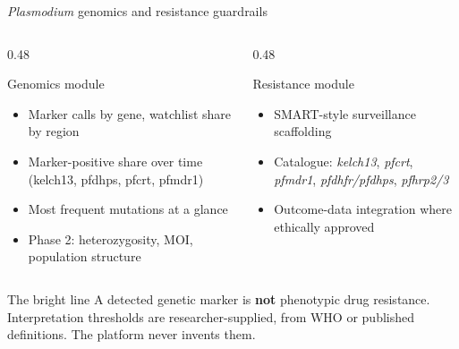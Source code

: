 \documentclass[aspectratio=169,11pt]{beamer}
\begin{document}
\begin{frame}{\emph{Plasmodium} genomics and resistance guardrails}
  \begin{columns}[c]
    \begin{column}{0.48\textwidth}
      \begin{block}{Genomics module}
        \begin{itemize}\small
          \item Marker calls by gene, watchlist share by region
          \item Marker-positive share over time (kelch13, pfdhps, pfcrt, pfmdr1)
          \item Most frequent mutations at a glance
          \item Phase 2: heterozygosity, MOI, population structure
        \end{itemize}
      \end{block}
    \end{column}
    \begin{column}{0.48\textwidth}
      \begin{block}{Resistance module}
        \begin{itemize}\small
          \item SMART-style surveillance scaffolding
          \item Catalogue: \emph{kelch13}, \emph{pfcrt}, \emph{pfmdr1}, \emph{pfdhfr/pfdhps}, \emph{pfhrp2/3}
          \item Outcome-data integration where ethically approved
        \end{itemize}
      \end{block}
    \end{column}
  \end{columns}
  \vspace{2mm}
  \begin{alertblock}{The bright line}
    A detected genetic marker is \textbf{not} phenotypic drug resistance.
    Interpretation thresholds are researcher-supplied, from WHO or published
    definitions. The platform never invents them.
  \end{alertblock}
\end{frame}
\end{document}
